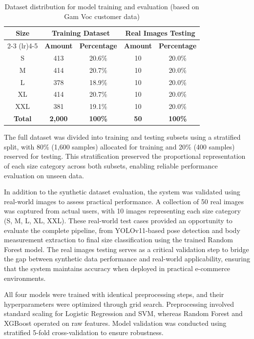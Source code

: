 \documentclass{llncs}
\begin{document}
\begin{table}[H]
\centering
\caption{Dataset distribution for model training and evaluation (based on Gam Voc customer data)}
\setlength{\tabcolsep}{12pt}
\renewcommand{\arraystretch}{1.3}
\begin{tabular}{ccccc}
\toprule
\multirow{2}{*}{\textbf{Size}} & \multicolumn{2}{c}{\textbf{Training Dataset}} & \multicolumn{2}{c}{\textbf{Real Images Testing}} \\
\cmidrule(lr){2-3} \cmidrule(lr){4-5}
& \textbf{Amount} & \textbf{Percentage} & \textbf{Amount} & \textbf{Percentage} \\
\midrule
S & 413 & 20.6\% & 10 & 20.0\% \\
M & 414 & 20.7\% & 10 & 20.0\% \\
L & 378 & 18.9\% & 10 & 20.0\% \\
XL & 414 & 20.7\% & 10 & 20.0\% \\
XXL & 381 & 19.1\% & 10 & 20.0\% \\
\midrule
\textbf{Total} & \textbf{2,000} & \textbf{100\%} & \textbf{50} & \textbf{100\%} \\
\bottomrule
\end{tabular}
\end{table}

The full dataset was divided into training and testing subsets using a stratified split, with 80\% (1,600 samples) allocated for training and 20\% (400 samples) reserved for testing. 
This stratification preserved the proportional representation of each size category across both subsets, enabling reliable performance evaluation on unseen data.

In addition to the synthetic dataset evaluation, the system was validated using real-world images to assess practical performance. A collection of 50 real images was captured from actual users, with 10 images representing each size category (S, M, L, XL, XXL). These real-world test cases provided an opportunity to evaluate the complete pipeline, from YOLOv11-based pose detection and body measurement extraction to final size classification using the trained Random Forest model. The real images testing serves as a critical validation step to bridge the gap between synthetic data performance and real-world applicability, ensuring that the system maintains accuracy when deployed in practical e-commerce environments.

All four models were trained with identical preprocessing steps, and their hyperparameters were optimized through grid search. 
Preprocessing involved standard scaling for Logistic Regression and SVM, whereas Random Forest and XGBoost operated on raw features. 
Model validation was conducted using stratified 5-fold cross-validation to ensure robustness.
\end{document}
